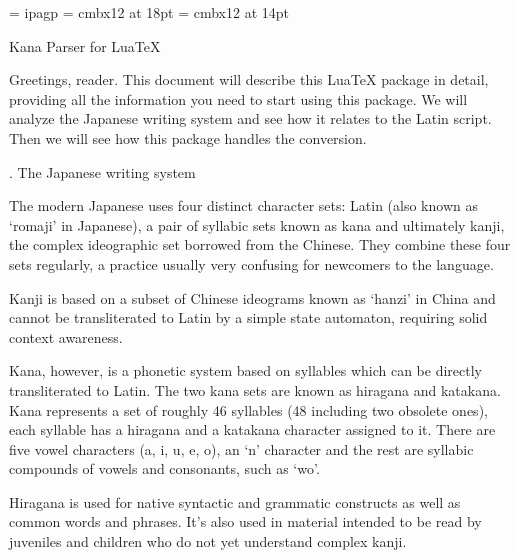

\font\jp = ipagp %
\font\hdf = cmbx12 at 18pt
\font\nmf = cmbx12 at 14pt

\def\jchar#1{{\jp #1}}
\def\kpth#1{\jchar{\toHiragana{#1}}}
\def\kptk#1{\jchar{\toKatakana{#1}}}
\def\kptl#1{\jchar{\toLatin{#1}}}

\def\hd#1{{\hdf#1}\vskip 10pt}
\def\nm#1{\vskip 10pt{\nmf#1}\vskip 8pt}

\parserInit %

\hd{Kana Parser for Lua\TeX}

Greetings, reader. This document will describe this Lua\TeX \kern3pt package in detail, providing all the information you need to start using this package.
We will analyze the Japanese writing system and see how it relates to the Latin script. Then we will see how this package handles the conversion.

\nm{1. The Japanese writing system}

The modern Japanese uses four distinct character sets: Latin (also known as `romaji' in Japanese), a pair of syllabic sets known as kana and ultimately kanji, the complex ideographic set borrowed from the Chinese. They combine these four sets regularly, a practice usually very confusing for newcomers to the language.

Kanji is based on a subset of Chinese ideograms known as `hanzi' in China and cannot be transliterated to Latin by a simple state automaton, requiring solid context awareness.

Kana, however, is a phonetic system based on syllables which can be directly transliterated to Latin. The two kana sets are known as hiragana and katakana.
Kana represents a set of roughly 46 syllables (48 including two obsolete ones), each syllable has a hiragana and a katakana character assigned to it.
There are five vowel characters (a, i, u, e, o), an `n' character and the rest are syllabic compounds of vowels and consonants, such as `wo'.

Hiragana is used for native syntactic and grammatic constructs as well as common words and phrases. It's also used in material intended to be read by juveniles and children who do not yet understand complex kanji.

